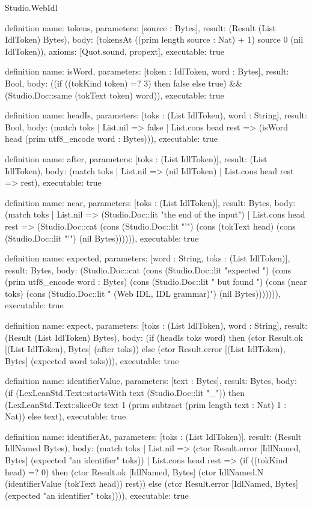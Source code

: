 \begin{lexlean}{Studio.WebIdl}
\begin{semanticmodule}
definition{
  name: tokens,
  parameters: [source : Bytes],
  result: (Result (List IdlToken) Bytes),
  body: (tokensAt ((prim length source : Nat) + 1) source 0 (nil IdlToken)),
  axioms: [Quot.sound, propext],
  executable: true
}

definition{
  name: isWord,
  parameters: [token : IdlToken, word : Bytes],
  result: Bool,
  body: ((if ((tokKind token) =? 3) then false else true) && (Studio.Doc::same (tokText token) word)),
  executable: true
}

definition{
  name: headIs,
  parameters: [toks : (List IdlToken), word : String],
  result: Bool,
  body: (match toks
    | List.nil => false
    | List.cons head rest => (isWord head (prim utf8_encode word : Bytes))),
  executable: true
}

definition{
  name: after,
  parameters: [toks : (List IdlToken)],
  result: (List IdlToken),
  body: (match toks
    | List.nil => (nil IdlToken)
    | List.cons head rest => rest),
  executable: true
}

definition{
  name: near,
  parameters: [toks : (List IdlToken)],
  result: Bytes,
  body: (match toks
    | List.nil => (Studio.Doc::lit "the end of the input")
    | List.cons head rest => (Studio.Doc::cat (cons (Studio.Doc::lit "'") (cons (tokText head) (cons (Studio.Doc::lit "'") (nil Bytes)))))),
  executable: true
}

definition{
  name: expected,
  parameters: [word : String, toks : (List IdlToken)],
  result: Bytes,
  body: (Studio.Doc::cat (cons (Studio.Doc::lit "expected ") (cons (prim utf8_encode word : Bytes) (cons (Studio.Doc::lit " but found ") (cons (near toks) (cons (Studio.Doc::lit " (Web IDL, IDL grammar)") (nil Bytes))))))),
  executable: true
}

definition{
  name: expect,
  parameters: [toks : (List IdlToken), word : String],
  result: (Result (List IdlToken) Bytes),
  body: (if (headIs toks word) then (ctor Result.ok [(List IdlToken), Bytes] (after toks)) else (ctor Result.error [(List IdlToken), Bytes] (expected word toks))),
  executable: true
}

definition{
  name: identifierValue,
  parameters: [text : Bytes],
  result: Bytes,
  body: (if (LexLeanStd.Text::startsWith text (Studio.Doc::lit "_")) then (LexLeanStd.Text::sliceOr text 1 (prim subtract (prim length text : Nat) 1 : Nat)) else text),
  executable: true
}

definition{
  name: identifierAt,
  parameters: [toks : (List IdlToken)],
  result: (Result IdlNamed Bytes),
  body: (match toks
    | List.nil => (ctor Result.error [IdlNamed, Bytes] (expected "an identifier" toks))
    | List.cons head rest => (if ((tokKind head) =? 0) then (ctor Result.ok [IdlNamed, Bytes] (ctor IdlNamed.N (identifierValue (tokText head)) rest)) else (ctor Result.error [IdlNamed, Bytes] (expected "an identifier" toks)))),
  executable: true
}


\end{semanticmodule}
\end{lexlean}
